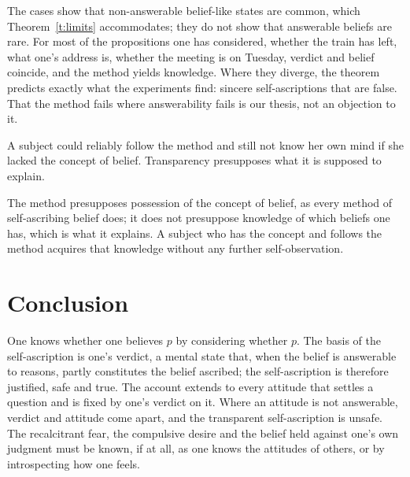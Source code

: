 \documentclass{situationist-preprint}
\begin{document}
\begin{reply}
The cases show that non-answerable belief-like states are common, which Theorem~\ref{t:limits} accommodates; they do not show that answerable beliefs are rare. For most of the propositions one has considered, whether the train has left, what one's address is, whether the meeting is on Tuesday, verdict and belief coincide, and the method yields knowledge. Where they diverge, the theorem predicts exactly what the experiments find: sincere self-ascriptions that are false. That the method fails where answerability fails is our thesis, not an objection to it.
\end{reply}

\begin{objection}
A subject could reliably follow the method and still not know her own mind if she lacked the concept of belief. Transparency presupposes what it is supposed to explain.
\end{objection}

\begin{reply}
The method presupposes possession of the concept of belief, as every method of self-ascribing belief does; it does not presuppose knowledge of which beliefs one has, which is what it explains. A subject who has the concept and follows the method acquires that knowledge without any further self-observation.
\end{reply}

\section{Conclusion}

One knows whether one believes $p$ by considering whether $p$. The basis of the self-ascription is one's verdict, a mental state that, when the belief is answerable to reasons, partly constitutes the belief ascribed; the self-ascription is therefore justified, safe and true. The account extends to every attitude that settles a question and is fixed by one's verdict on it. Where an attitude is not answerable, verdict and attitude come apart, and the transparent self-ascription is unsafe. The recalcitrant fear, the compulsive desire and the belief held against one's own judgment must be known, if at all, as one knows the attitudes of others, or by introspecting how one feels.
\end{document}
